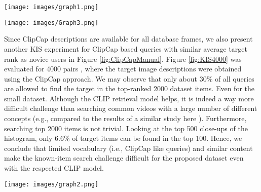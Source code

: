 \documentclass[runningheads]{llncs}
\begin{document}
\begin{figure*}
\begin{center}
    \centering
\texttt{[image: images/graph1.png]}
\end{center}
  \caption{Occurrence of words in frame captions. Computed for a subset of the dataset.}
\label{fig:Words}
\end{figure*}

\begin{figure*}
\begin{center}
\centering
\texttt{[image: images/Graph3.png]}
\end{center}
  \caption{Ranks for ClipCap, Novice, and VBS Expert text queries for 100 target images. }
\label{fig:ClipCapManual}
\end{figure*}

Since ClipCap descriptions are available for all database frames, we also present another KIS experiment for ClipCap based queries with similar average target rank as novice users in Figure \ref{fig:ClipCapManual}.
Figure \ref{fig:KIS4000} was evaluated for 4000 pairs , where the target image descriptions were obtained using the ClipCap approach. We may observe that only about 30\% of all queries are allowed to find the target in the top-ranked 2000 dataset items. Even for the small dataset. Although the CLIP retrieval model helps, it is indeed a way more difficult challenge than searching common videos with a large number of different concepts (e.g., compared to the results of a similar study here \cite{LokocS21}). Furthermore, searching top 2000 items is not trivial. Looking at the top 500 close-ups of the histogram, only 6.6\% of target items can be found in the top 100. Hence, we conclude that limited vocabulary (i.e., ClipCap like queries) and similar content make the known-item search challenge difficult for the proposed dataset even with the respected CLIP model.

\begin{figure*}
\begin{center}
    \centering
\texttt{[image: images/graph2.png]}
\end{center}
  \caption{4000 KIS queries using ClipCap captions, histogram bins aggregate ranks of target images for the corresponding queries.}
\label{fig:KIS4000}
\end{figure*}
\end{document}
